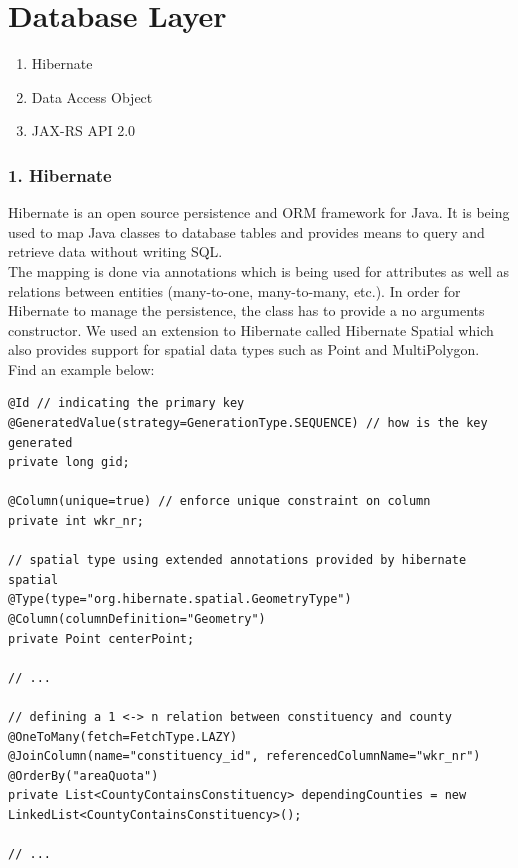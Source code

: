 
\section{Database Layer}

\begin{enumerate}
\def\labelenumi{\arabic{enumi}.}
\itemsep1pt\parskip0pt
\item
  Hibernate
\item
  Data Access Object
\item
  JAX-RS API 2.0
\end{enumerate}

\subsubsection{1. Hibernate}\label{hibernate}

Hibernate is an open source persistence and ORM framework for Java. It
is being used to map Java classes to database tables and provides means
to query and retrieve data without writing SQL.\\The mapping is done via
annotations which is being used for attributes as well as relations
between entities (many-to-one, many-to-many, etc.). In order for
Hibernate to manage the persistence, the class has to provide a no
arguments constructor. We used an extension to Hibernate called
Hibernate Spatial which also provides support for spatial data types
such as Point and MultiPolygon. Find an example below:


\begin{lstlisting}
@Id // indicating the primary key
@GeneratedValue(strategy=GenerationType.SEQUENCE) // how is the key generated
private long gid;

@Column(unique=true) // enforce unique constraint on column
private int wkr_nr;

// spatial type using extended annotations provided by hibernate spatial
@Type(type="org.hibernate.spatial.GeometryType")
@Column(columnDefinition="Geometry")
private Point centerPoint;

// ...

// defining a 1 <-> n relation between constituency and county
@OneToMany(fetch=FetchType.LAZY)
@JoinColumn(name="constituency_id", referencedColumnName="wkr_nr")
@OrderBy("areaQuota")
private List<CountyContainsConstituency> dependingCounties = new LinkedList<CountyContainsConstituency>();

// ...
\end{lstlisting}


